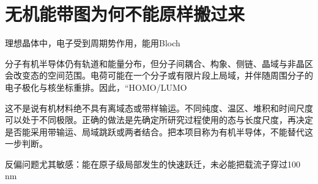 \section{{\cjkfont 无机能带图为何不能原样搬过来}\allowbreak{}}\label{sec:3}
{\cjkfont 理想晶体中，电子受到周期势作用，能用}\allowbreak{}Bloch\allowbreak{}
\par
{\cjkfont 分子有机半导体仍有轨道和能量分布，但分子间耦合、构象、侧链、晶域与非晶区会改变态的空间范围。电荷可能在一个分子或有限片段上局域，并伴随周围分子的电子极化与核坐标重排。因此，“}\nobreak{}HOMO/LUMO\allowbreak{}
\par
{\cjkfont 这不是说有机材料绝不具有离域态或带样输运。不同纯度、温区、堆积和时间尺度可以处于不同极限。正确的做法是先确定所研究过程使用的态与长度尺度，再决定是否能采用带输运、局域跳跃或两者结合。把本项目称为有机半导体，不能替代这一步判断。}\allowbreak{}
\par
{\cjkfont 反偏问题尤其敏感：能在原子级局部发生的快速跃迁，未必能把载流子穿过}\allowbreak{}100 nm\allowbreak{}
\par
